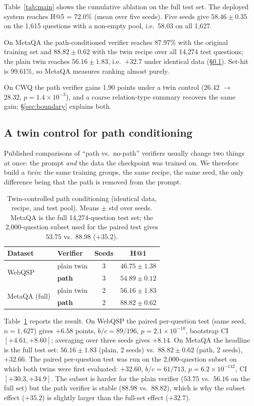 \documentclass[sigconf,review]{acmart}
\begin{document}
Table~\ref{tab:main} shows the cumulative ablation on the full test set. The deployed system reaches H@5 = 72.0\% (mean over five seeds). Five seeds give $58.46\pm0.35$ on the 1,615 questions with a non-empty pool, i.e.\ 58.03 on all 1,627.

On MetaQA the path-conditioned verifier reaches 87.97\% with the original training set and $88.82\pm0.62$ with the twin recipe over all 14,274 test questions; the plain twin reaches $56.16\pm1.83$, i.e.\ $+32.7$ under identical data (\S\ref{sec:twin}). Set-hit is 99.61\%, so MetaQA measures ranking almost purely.

On CWQ the path verifier gains 1.90 points under a twin control (26.42 $\rightarrow$ 28.32, $p=1.4\times10^{-3}$), and a coarse relation-type summary recovers the same gain; \S\ref{sec:boundary} explains both.

\subsection{A twin control for path conditioning}
\label{sec:twin}

Published comparisons of ``path vs.\ no-path'' verifiers usually change two things at once: the prompt \emph{and} the data the checkpoint was trained on. We therefore build a \emph{twin}: the same training groups, the same recipe, the same seed, the only difference being that the path is removed from the prompt.

\begin{table}[t]
\centering\small
\caption{Twin-controlled path conditioning (identical data, recipe, and test pool). Means $\pm$ std over seeds. MetaQA is the full 14{,}274-question test set; the 2{,}000-question subset used for the paired test gives $53.75$ vs.\ $88.98$ ($+35.2$).}
\label{tab:twin}
\begin{tabular}{llcc}
\toprule
Dataset & Verifier & Seeds & H@1 \\
\midrule
\multirow{2}{*}{WebQSP} & plain twin & 3 & $46.75\pm1.38$ \\
 & \textbf{path} & 3 & $\mathbf{54.89\pm0.12}$ \\
\midrule
\multirow{2}{*}{MetaQA (full)} & plain twin & 2 & $56.16\pm1.83$ \\
 & \textbf{path} & 2 & $\mathbf{88.82\pm0.62}$ \\
\bottomrule
\end{tabular}
\end{table}

Table~\ref{tab:twin} reports the result. On WebQSP the paired per-question test (same seed, $n=1{,}627$) gives $+6.58$ points, $b/c=89/196$, $p=2.1\times10^{-10}$, bootstrap CI $[+4.61,+8.60]$; averaging over three seeds gives $+8.14$. On MetaQA the headline is the full test set: $56.16\pm1.83$ (plain, 2 seeds) vs.\ $88.82\pm0.62$ (path, 2 seeds), $+32.66$. The paired per-question test was run on the 2{,}000-question subset on which both twins were first evaluated: $+32.60$, $b/c=61/713$, $p=6.2\times10^{-142}$, CI $[+30.3,+34.9]$. The subset is harder for the plain verifier ($53.75$ vs.\ $56.16$ on the full set) but the path verifier is stable ($88.98$ vs.\ $88.82$), which is why the subset effect ($+35.2$) is slightly larger than the full-set effect ($+32.7$).
\end{document}
